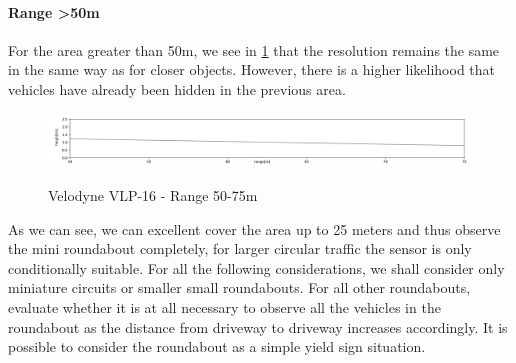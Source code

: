 \documentclass[11pt,oneside,openright]{mpreport}
\begin{document}
\paragraph{Range >50m}

For the area greater than 50m, we see in \cref{velodyne_range_75} that the resolution remains the same in the same way as for closer objects.
However, there is a higher likelihood that vehicles have already been hidden in the previous area.

\begin{figure}[!ht]
\caption{Velodyne VLP-16 - Range 50-75m}
\includegraphics[width=\textwidth]{bilder/range_75.png}
\label{velodyne_range_75}
\end{figure}




As we can see, we can excellent cover the area up to 25 meters and thus observe the mini roundabout completely, for larger circular traffic the sensor is only conditionally suitable. 
For all the following considerations, we shall consider only miniature circuits or smaller small roundabouts. 
For all other roundabouts, evaluate whether it is at all necessary to observe all the vehicles in the roundabout as the distance from driveway to driveway increases accordingly.
It is possible to consider the roundabout as a simple yield sign situation.
\end{document}
